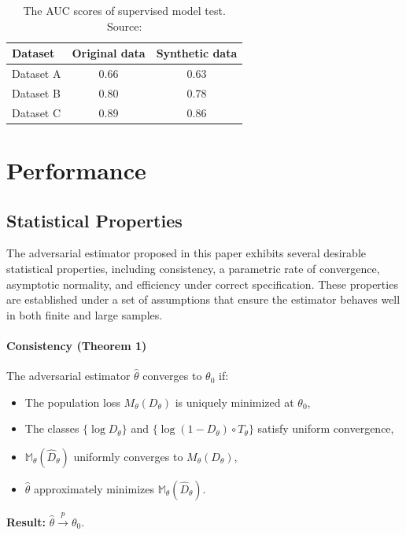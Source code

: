 \documentclass[12pt]{article}
\begin{document}
\begin{table}[h!]
    \centering
    \begin{tabular}{lcc}
        \hline Dataset & Original data & Synthetic data \\
        \hline Dataset A & 0.66 & 0.63 \\
        Dataset B & 0.80 & 0.78 \\
        Dataset C & 0.89 & 0.86 \\
        \hline
    \end{tabular}
    \caption{The AUC scores of supervised model test. Source: \cite{efimovUsingGenerativeAdversarial2020}}
    \label{tab:auc_scores}
\end{table}

\section{Performance} \label{sec:performance}

\subsection{Statistical Properties} \label{subsec:statistical_properties}

The adversarial estimator proposed in this paper exhibits several desirable
statistical properties, including consistency, a parametric rate of
convergence, asymptotic normality, and efficiency under correct specification.
These properties are established under a set of assumptions that ensure the
estimator behaves well in both finite and large samples.

\paragraph{Consistency (Theorem 1)} The adversarial estimator \(\hat{\theta}\) converges to \(\theta_0\) if:
\begin{itemize}
    \item The population loss \(M_\theta(D_\theta)\) is uniquely minimized at
          \(\theta_0\),
    \item The classes \(\{\log D_\theta\}\) and \(\{\log(1 - D_\theta) \circ T_\theta\}\)
          satisfy uniform convergence,
    \item \(\mathbb{M}_\theta(\hat{D}_\theta)\) uniformly converges to \(M_\theta(D_\theta)\),
    \item \(\hat{\theta}\) approximately minimizes \(\mathbb{M}_\theta(\hat{D}_\theta)\).
\end{itemize}
\textbf{Result:} \(\hat{\theta} \xrightarrow{p} \theta_0\).
\end{document}
